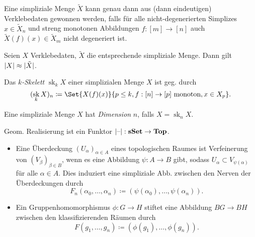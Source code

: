 \documentclass{cheat-sheet}
\DeclareMathOperator{\sk}{sk} %
\begin{document}
\begin{prop}
  Eine simpliziale Menge $\tilde{X}$ kann genau dann aus (dann eindeutigen) Verklebedaten gewonnen werden, falls für alle nicht-degenerierten Simplizes $x \in \tilde{X}_n$ und streng monotonen Abbildungen $f : [m] \to [n]$ auch $\tilde{X}(f)(x) \in \tilde{X}_m$ nicht degeneriert ist.
\end{prop}


\begin{prop}
  Seien $X$ Verklebedaten, $\tilde{X}$ die entsprechende simpliziale Menge. Dann gilt $\lvert X\rvert \approx \lvert\tilde{X}\rvert$.
\end{prop}

\begin{defn}
  Das \emph{$k$-Skelett} $\sk_k X$ einer simplizialen Menge $X$ ist geg. durch
  \[ (\sk_k X)_n \coloneqq \Set{ X(f)(x) }{ p \leq k, f : [n] \to [p] \text{ monoton}, x \in X_p }. \]
\end{defn}

\begin{defn}
  Eine simpliziale Menge $X$ hat \emph{Dimension} $n$, falls $X = \sk_n X$.
\end{defn}

\begin{prop}
  Geom. Realisierung ist ein Funktor $\lvert\text{--}\rvert : \mathbf{sSet} \to \mathbf{Top}$.
\end{prop}

\begin{bspe}
  \begin{itemize}
    \item Eine Überdeckung $(U_\alpha)_{\alpha \in A}$ eines topologischen Raumes ist Verfeinerung von $(V_\beta)_{\beta \in B}$, wenn es eine Abbildung $\psi : A \to B$ gibt, sodass $U_\alpha \subset V_{\psi(\alpha)}$ für alle $\alpha \in A$. Dies induziert eine simpliziale Abb. zwischen den Nerven der Überdeckungen durch
    \[ F_n(\alpha_0, \ldots, \alpha_n) \coloneqq (\psi(\alpha_0), \ldots, \psi(\alpha_n)). \]
    \item Ein Gruppenhomomorphismus $\phi : G \to H$ stiftet eine Abbildung $BG \to BH$ zwischen den klassifizierenden Räumen durch
    \[ F(g_1, \ldots, g_n) \coloneqq (\phi(g_1), \ldots, \phi(g_n)). \]
  \end{itemize}
\end{bspe}

\end{document}
